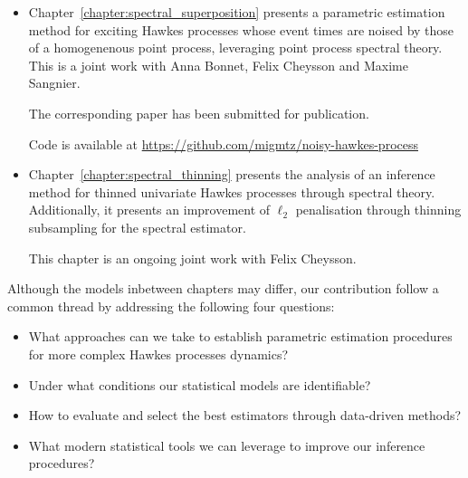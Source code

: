     \begin{itemize}
      \item Chapter~\ref{chapter:spectral_superposition} presents a parametric estimation method for exciting Hawkes processes whose event times are noised by those of a homogenenous point process, leveraging point process spectral theory. 
      This is a joint work with Anna Bonnet, Felix Cheysson and Maxime Sangnier. 

      The corresponding paper \parencite{Bonnet2024} has been submitted for publication.

      Code is available at \url{https://github.com/migmtz/noisy-hawkes-process}

      \item Chapter~\ref{chapter:spectral_thinning} presents the analysis of an inference method for thinned univariate Hawkes processes through spectral theory. 
      Additionally, it presents an improvement of $\ell_2$ penalisation through thinning subsampling for the spectral estimator.

      This chapter is an ongoing joint work with Felix Cheysson.
    \end{itemize}

    Although the models inbetween chapters may differ, our contribution follow a common thread by addressing the following four questions: 

    \begin{tcolorbox}
      \begin{itemize}
        \item What approaches can we take to establish parametric estimation procedures for more complex Hawkes processes dynamics?
        \item Under what conditions our statistical models are identifiable?
        \item How to evaluate and select the best estimators through data-driven methods?
        \item What modern statistical tools we can leverage to improve our inference procedures?
      \end{itemize}
    \end{tcolorbox}
    


